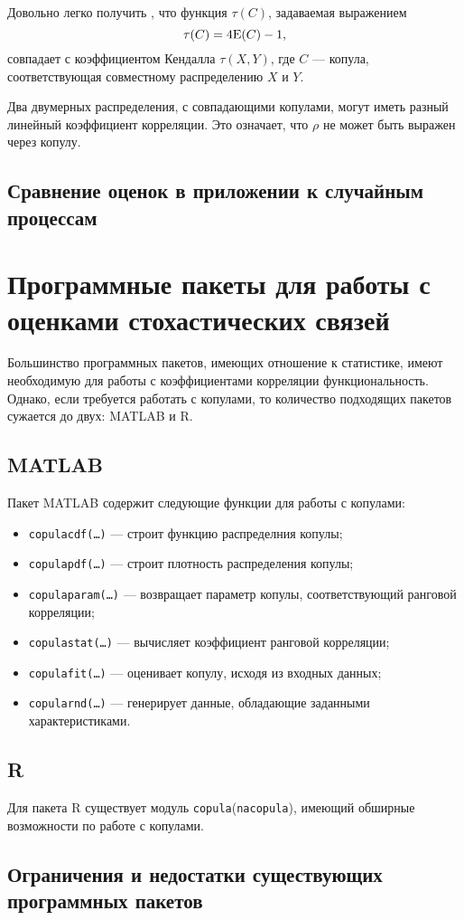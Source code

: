 Довольно легко получить \cite{Nelsen1999}, что функция $\tau(C)$, задаваемая выражением
\begin{equation}
	\tau(C) = 4\mathrm{E}(C) - 1,
\end{equation}
совпадает с коэффициентом Кендалла $\tau(X, Y)$, где $C$ --- копула, соответствующая совместному распределению $X$ и $Y$.

Два двумерных распределения, с совпадающими копулами, могут иметь разный линейный коэффициент корреляции. Это означает, что $\rho$ не может быть выражен через копулу.

\subsection*{Сравнение оценок в приложении к случайным процессам}

\section*{Программные пакеты для работы с оценками стохастических связей}
Большинство программных пакетов, имеющих отношение к статистике, имеют необходимую для работы с коэффициентами корреляции функциональность. Однако, если требуется работать с копулами, то количество подходящих пакетов сужается до двух: MATLAB и R.

\subsection*{MATLAB}
Пакет MATLAB содержит следующие функции для работы с копулами:
\begin{itemize}
	\item \texttt{copulacdf(\ldots)} --- строит функцию распределния копулы;
	\item \texttt{copulapdf(\ldots)} --- строит плотность распределения копулы;
	\item \texttt{copulaparam(\ldots)} --- возвращает параметр копулы, соответствующий ранговой корреляции;
	\item \texttt{copulastat(\ldots)} --- вычисляет коэффициент ранговой корреляции;
	\item \texttt{copulafit(\ldots)} --- оценивает копулу, исходя из входных данных;
	\item \texttt{copularnd(\ldots)} --- генерирует данные, обладающие заданными характеристиками.
\end{itemize}

\subsection*{R}
Для пакета R существует модуль \texttt{copula}(\texttt{nacopula}), имеющий обширные возможности \cite{Rcopula} по работе с копулами.

\subsection*{Ограничения и недостатки существующих программных пакетов}

\clearpage
